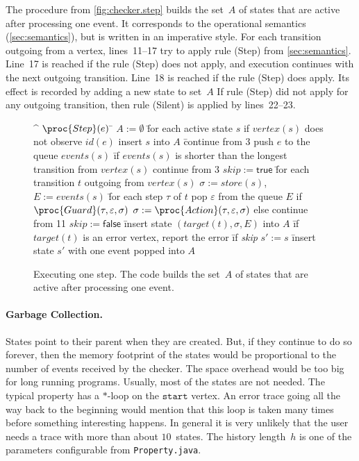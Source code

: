 \documentclass[9pt, preprint]{sigplanconf} %
\newcommand{\start}{\ensuremath{\mathtt{start}}\xspace}
\theoremstyle{definition}
\theoremstyle{remark}
\begin{document}
The procedure from \autoref{fig:checker.step} builds the set~$A$ of states that are active after processing one event.
It corresponds to the operational semantics (\autoref{sec:semantics}), but is written in an imperative style.
For each transition outgoing from a vertex, lines~\hbox{11--17} try to apply rule (Step) from \autoref{sec:semantics}.
Line~17 is reached if the rule (Step) does not apply, and execution continues with the next outgoing transition.
Line~18 is reached if the rule (Step) does apply.
Its effect is recorded by adding a new state to set~$A$
If rule (Step) did not apply for any outgoing transition, then rule (Silent) is applied by lines~22--23.

\begin{figure*}[t]
\begin{center}
\begin{alg}
\^  $\proc{Step}(e)$
\=  $A := \emptyset$
\=  for each active state $s$
\+    if $\mathit{vertex}(s)$ does not observe $\mathit{id}(e)$
\+      insert $s$ into $A$
\=      continue from $3$
\-    push $e$ to the queue $\mathit{events}(s)$
\=    if $\mathit{events}(s)$ is shorter than the longest transition from $\mathit{vertex}(s)$
\+      continue from $3$
\1    $\mathit{skip}:=\mathsf{true}$
\=    for each transition $t$ outgoing from $\mathit{vertex}(s)$
\+      $\sigma := \mathit{store}(s)$,\quad $E := \mathit{events}(s)$
\=      for each step $\tau$ of $t$
\+        pop $\varepsilon$ from the queue $E$
\+        if $\proc{Guard}(\tau, \varepsilon, \sigma)$
\+          $\sigma := \proc{Action}(\tau, \varepsilon, \sigma)$
\-        else
\+          continue from 11
\2      $\mathit{skip}:=\mathsf{false}$
\=      insert state $(\mathit{target}(t), \sigma, E)$ into $A$
\=      if $\mathit{target}(t)$ is an error vertex, report the error
\=      if \textit{skip}
\+        $s' := s$
\=        insert state $s'$ with one event popped into $A$
\end{alg}
\bigskip
\caption{
  Executing one step.
  The code builds the set~$A$ of states that are active after processing one event.
}
\label{fig:checker.step}
\end{center}
\end{figure*}

\paragraph{Garbage Collection.}

States point to their parent when they are created.
But, if they continue to do so forever, then the memory footprint of the states would be proportional to the number of events received by the checker.
The space overhead would be too big for long running programs.
Usually, most of the states are not needed.
The typical property has a $*$-loop on the \start vertex.
An error trace going all the way back to the beginning would mention that this loop is taken many times before something interesting happens.
In general it is very unlikely that the user needs a trace with more than about $10$~states.
The history length~$h$ is one of the parameters configurable from {\tt Property.java}.
\end{document}
